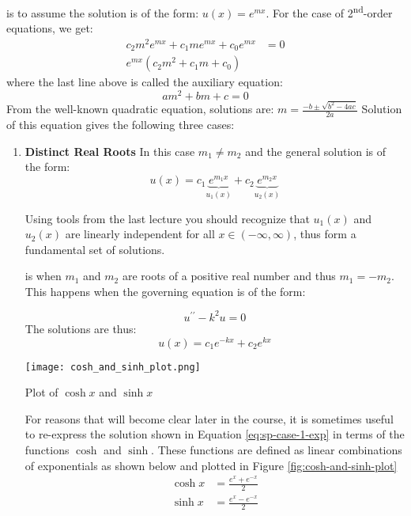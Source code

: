  is to assume the solution is of the form: $u(x)=e^{mx}$. For the case of 2\textsuperscript{nd}-order equations, we get:
\begin{align*}
c_2m^2e^{mx}+c_1me^{mx}+c_0e^{mx}&=0 \\
e^{mx}\left(c_2m^2+c_1m+c_0\right)
\end{align*}
\noindent where the last line above is called the auxiliary equation: 
\begin{equation}
am^2+bm+c = 0
\label{eq:aux-eqn}
\end{equation}
From the well-known quadratic equation, solutions are: $m = \frac{-b\pm\sqrt{b^2-4ac}}{2a}$
Solution of this equation gives the following three cases:
\begin{enumerate}
\item \textbf{Distinct Real Roots}
In this case $m_1 \ne m_2$ and the general solution is of the form:
\begin{equation}
u(x) = c_1\underbrace{e^{m_1x}}_{u_1(x)}+c_2\underbrace{e^{m_2x}}_{u_2(x)}
\label{eq:dist-real-roots}
\end{equation}

Using tools from the last lecture you should recognize that $u_1(x)$ and $u_2(x)$ are linearly independent for all $x\in \left( -\infty,\infty\right)$, thus form a fundamental set of solutions.  

 is when $m_1$ and $m_2$ are roots of a positive real number and thus $m_1 = -m_2$.  This happens when the governing equation is of the form:

\begin{equation}
u^{\prime \prime} - k^2 u = 0
\end{equation}
The solutions are thus:
\begin{equation}
u(x) = c_1 e^{-kx} + c_2e^{kx}
\label{eq:sp-case-1-exp}
\end{equation}
\begin{marginfigure}
\texttt{[image: cosh\_and\_sinh\_plot.png]}
\caption{Plot of $\cosh{x}$ and $\sinh{x}$}
\label{fig:cosh-and-sinh-plot}
\end{marginfigure}


For reasons that will become clear later in the course, it is sometimes useful to re-express the solution shown in Equation \ref{eq:sp-case-1-exp} in terms of the functions $\cosh$ and $\sinh$.  These functions are defined as linear combinations of exponentials as shown below and plotted in Figure \ref{fig:cosh-and-sinh-plot}
\begin{align*}
\cosh{x} &= \frac{e^{x} + e^{-x}}{2} \\
\sinh{x} &= \frac{e^{x} - e^{-x}}{2}
\end{align*}




\end{enumerate}
